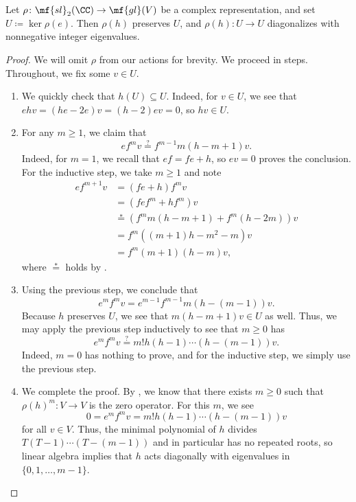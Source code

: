 \documentclass[../notes.tex]{subfiles}
\begin{document}
\begin{lemma} \label{lem:sl2-h-diagonalizes}
	Let $\rho\colon\mf{sl}_2(\CC)\to\mf{gl}(V)$ be a complex representation, and set $U\coloneqq\ker\rho(e)$. Then $\rho(h)$ preserves $U$, and $\rho(h)\colon U\to U$ diagonalizes with nonnegative integer eigenvalues.
\end{lemma}
\begin{proof}
	We will omit $\rho$ from our actions for brevity. We proceed in steps. Throughout, we fix some $v\in U$.
	\begin{enumerate}
		\item We quickly check that $h(U)\subseteq U$. Indeed, for $v\in U$, we see that $ehv=(he-2e)v=(h-2)ev=0$, so $hv\in U$.
		\item For any $m\ge1$, we claim that
		\begin{equation}
			ef^mv\stackrel?=f^{m-1}m(h-m+1)v. \label{eq:sl2-e-f-power}
		\end{equation}
		Indeed, for $m=1$, we recall that $ef=fe+h$, so $ev=0$ proves the conclusion. For the inductive step, we take $m\ge1$ and note
		\begin{align*}
			ef^{m+1}v &= (fe+h)f^mv \\
			&= \left(fef^m+hf^m\right)v \\
			&\stackrel*= \left(f^mm(h-m+1)+f^m(h-2m)\right)v \\
			&= f^m\left((m+1)h-m^2-m\right)v \\
			&= f^m(m+1)(h-m)v,
		\end{align*}
		where $\stackrel*=$ holds by .
		\item Using the previous step, we conclude that
		\[e^mf^mv=e^{m-1}f^{m-1}m(h-(m-1))v.\]
		Because $h$ preserves $U$, we see that $m(h-m+1)v\in U$ as well. Thus, we may apply the previous step inductively to see that $m\ge0$ has
		\[e^mf^mv\stackrel?=m!h(h-1)\cdots(h-(m-1))v.\]
		Indeed, $m=0$ has nothing to prove, and for the inductive step, we simply use the previous step.
		\item We complete the proof. By , we know that there exists $m\ge0$ such that $\rho(h)^m\colon V\to V$ is the zero operator. For this $m$, we see
		\[0=e^mf^mv=m!h(h-1)\cdots(h-(m-1))v\]
		for all $v\in V$. Thus, the minimal polynomial of $h$ divides $T(T-1)\cdots(T-(m-1))$ and in particular has no repeated roots, so linear algebra implies that $h$ acts diagonally with eigenvalues in $\{0,1,\ldots,m-1\}$.
		\qedhere
	\end{enumerate}
\end{proof}
\end{document}
